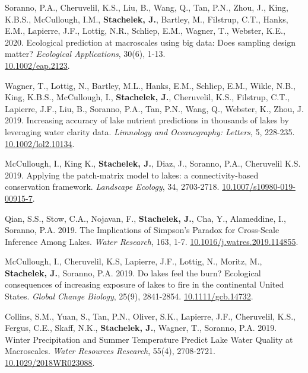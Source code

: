 \item Soranno, P.A., Cheruvelil, K.S., Liu, B., Wang, Q., Tan, P.N., Zhou, J., King, K.B.S., McCullough, I.M., \textbf{Stachelek, J.}, Bartley, M., Filstrup, C.T., Hanks, E.M., Lapierre, J.F., Lottig, N.R., Schliep, E.M., Wagner, T., Webster, K.E., 2020. Ecological prediction at macroscales using big data: Does sampling design matter? \emph{Ecological Applications}, 30(6), 1-13. \\ \href{https://doi.org/10.1002/eap.2123}{10.1002/eap.2123}. %

\item Wagner, T., Lottig, N., Bartley, M.L., Hanks, E.M., Schliep, E.M., Wikle, N.B., King, K.B.S., McCullough, I., \textbf{Stachelek, J.}, Cheruvelil, K.S., Filstrup, C.T., Lapierre, J.F., Liu, B., Soranno, P.A., Tan, P.N., Wang, Q., Webster, K.,  Zhou, J. 2019. Increasing accuracy of lake nutrient predictions in thousands of lakes by leveraging water clarity data. \emph{Limnology and Oceanography: Letters}, 5, 228-235. \href{https://doi.org/10.1002/lol2.10134}{10.1002/lol2.10134}. %

\item McCullough, I., King K., \textbf{Stachelek, J.}, Diaz, J., Soranno, P.A., Cheruvelil K.S. 2019. Applying the patch-matrix model to lakes: a connectivity-based conservation framework. \emph{Landscape Ecology}, 34, 2703-2718. \href{https://doi.org/10.1007/s10980-019-00915-7}{10.1007/s10980-019-00915-7}. %

\item Qian, S.S., Stow, C.A., Nojavan, F., \textbf{Stachelek, J.}, Cha, Y., Alameddine, I., Soranno, P.A. 2019. The Implications of Simpson's Paradox for Cross-Scale Inference Among Lakes. \emph{Water Research}, 163, 1-7. \href{https://doi.org/10.1016/j.watres.2019.114855}{10.1016/j.watres.2019.114855}. %

\item McCullough, I., Cheruvelil, K.S, Lapierre, J.F., Lottig, N., Moritz, M., \textbf{Stachelek, J.}, Soranno, P.A. 2019. Do lakes feel the burn? Ecological consequences of increasing exposure of lakes to fire in the continental United States. \emph{Global Change Biology}, 25(9), 2841-2854. \href{https://doi.org/10.1111/gcb.14732}{10.1111/gcb.14732}. %

\item Collins, S.M., Yuan, S., Tan, P.N., Oliver, S.K., Lapierre, J.F., Cheruvelil, K.S., Fergus, C.E., Skaff, N.K., \textbf{Stachelek, J.}, Wagner, T., Soranno, P.A. 2019. Winter Precipitation and Summer Temperature Predict Lake Water Quality at Macroscales. \emph{Water Resources Research}, 55(4), 2708-2721. \href{https://doi.org/10.1029/2018WR023088}{10.1029/2018WR023088}. %

